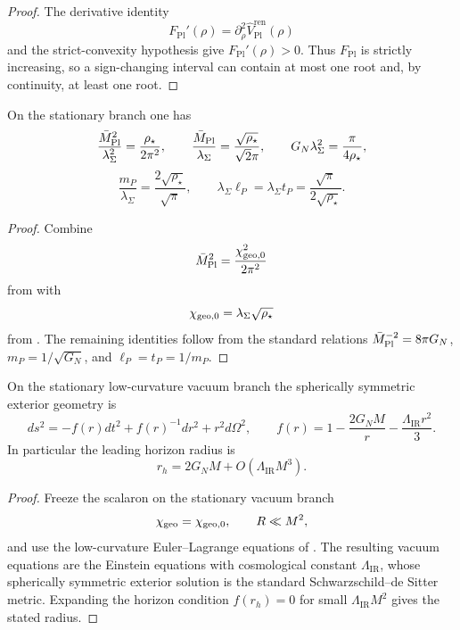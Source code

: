 \begin{proof}
The derivative identity
\[
F_{\mathrm{Pl}}'(\rho)=\partial_\rho^2\widehat V_{\mathrm{Pl}}^{\mathrm{ren}}(\rho)
\]
and the strict-convexity hypothesis give $F_{\mathrm{Pl}}'(\rho)>0$. Thus $F_{\mathrm{Pl}}$ is
strictly increasing, so a sign-changing interval can contain at most one root and, by continuity, at
least one root.
\end{proof}

\begin{corollary}
\label{cor:planck_normalization_stationary_branch}
On the stationary branch one has
\[
\frac{\bar M_{\mathrm{Pl}}^2}{\lambda_\Sigma^2}
=
\frac{\rho_\star}{2\pi^2},
\qquad
\frac{\bar M_{\mathrm{Pl}}}{\lambda_\Sigma}
=
\frac{\sqrt{\rho_\star}}{\sqrt2\pi},
\qquad
G_N\lambda_\Sigma^2
=
\frac{\pi}{4\rho_\star},
\]
\[
\frac{m_P}{\lambda_\Sigma}
=
\frac{2\sqrt{\rho_\star}}{\sqrt\pi},
\qquad
\lambda_\Sigma\ell_P=\lambda_\Sigma t_P
=
\frac{\sqrt\pi}{2\sqrt{\rho_\star}}.
\]
\end{corollary}

\begin{proof}
Combine
\[
\bar M_{\mathrm{Pl}}^2=\frac{\chi_{\mathrm{geo},0}^2}{2\pi^2}
\]
from  with
\[
\chi_{\mathrm{geo},0}=\lambda_\Sigma\sqrt{\rho_\star}
\]
from . The remaining identities follow from the standard
relations $\bar M_{\mathrm{Pl}}^{-2}=8\pi G_N$, $m_P=1/\sqrt{G_N}$, and $\ell_P=t_P=1/m_P$.
\end{proof}

\begin{corollary}
\label{cor:schwarzschild_de_sitter_vacuum_branch}
On the stationary low-curvature vacuum branch the spherically symmetric exterior geometry is
\[
ds^2=-f(r)dt^2+f(r)^{-1}dr^2+r^2d\Omega^2,
\qquad
f(r)=1-\frac{2G_NM}{r}-\frac{\Lambda_{\mathrm{IR}}r^2}{3}.
\]
In particular the leading horizon radius is
\[
r_h=2G_NM+O(\Lambda_{\mathrm{IR}}M^3).
\]
\end{corollary}

\begin{proof}
Freeze the scalaron on the stationary vacuum branch
\[
\chi_{\mathrm{geo}}=\chi_{\mathrm{geo},0},
\qquad
R\ll M^2,
\]
and use the low-curvature Euler--Lagrange equations of . The
resulting vacuum equations are the Einstein equations with cosmological constant
$\Lambda_{\mathrm{IR}}$, whose spherically symmetric exterior solution is the standard
Schwarzschild--de Sitter metric. Expanding the horizon condition $f(r_h)=0$ for small
$\Lambda_{\mathrm{IR}}M^2$ gives the stated radius.
\end{proof}

